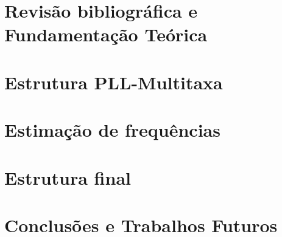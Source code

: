 \documentclass[
12pt,
openany, %
oneside, %
a4paper,			
english,			
brazil			        %
]{abntbibufjf}
\begin{document}
\chapter{Revisão bibliográfica e Fundamentação Teórica}


\chapter{Estrutura PLL-Multitaxa}


\chapter{Estimação de frequências}


\chapter{Estrutura final}


\chapter{Conclusões e Trabalhos Futuros}

%

\printbibliography
\end{document}
